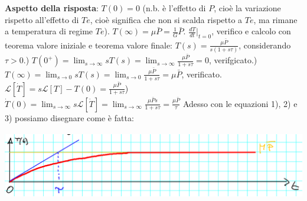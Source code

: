 \newline
\textbf{Aspetto della risposta}:\newline
\newline
$T(0) = 0$ (n.b. è l'effetto di $P$, cioè la variazione rispetto all'effetto di $Te$, cioè significa che non si scalda rispetto a $Te$, ma rimane a temperatura di regime $Te$).\newline
\newline
$T(\infty) = \mu \bar{P} = \frac{1}{G}\bar{P}$.\newline
\newline
$\frac{dT}{dt}|_{t=0}$, verifico e calcolo con teorema valore iniziale e teorema valore finale: $T(s) = \frac{\mu \bar{P}}{s(1+s \tau)}$, considerando $\tau> 0$.) $T(0^+) = \lim_{s\rightarrow \infty} s T(s) = \lim_{s\rightarrow \infty} \frac{\mu \bar{P}}{1+s \tau} = 0$, verifgicato.) $T(\infty) = \lim_{s\rightarrow 0}s T(s) = \lim_{s\rightarrow 0}\frac{\mu \bar{P}}{1 + s\tau} = \mu \bar{P}$, verificato.\newline
$\mathcal{L}[\dot{T}] = s \mathcal{L}[T] - T(0) = \frac{\mu \bar{P}}{1 + s \tau}$) $\dot{T}(0) = \lim_{s\rightarrow \infty} s \mathcal{L}[\dot{T}] = \lim_{s\rightarrow \infty}\frac{\mu \bar{P} s}{1+ s \tau} = \frac{\mu \bar{P}}{\tau}$\newline
\newline
Adesso con le equazioni 1), 2) e 3) possiamo disegnare come è fatta:
\begin{center}
    \includegraphics[height=3cm]{../lezione7/img2.PNG}
\end{center}